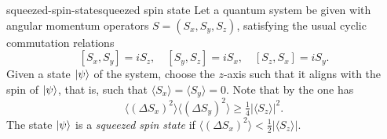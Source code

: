 \begin{topic}{squeezed-spin-state}{squeezed spin state}
    Let a quantum system be given with angular momentum operators $S = (S_x, S_y, S_z)$, satisfying the usual cyclic commutation relations
    \[ [S_x, S_y] = i S_z, \quad [S_y, S_z] = i S_x, \quad [S_z, S_x] = i S_y . \]
    Given a state $|\psi\rangle$ of the system, choose the $z$-axis such that it aligns with the spin of $|\psi\rangle$, that is, such that $\langle S_x \rangle = \langle S_y \rangle = 0$.
    Note that by the  one has
    \[ \langle (\Delta S_x)^2 \rangle \langle (\Delta S_y)^2 \rangle \ge \tfrac{1}{4} |\langle S_z \rangle|^2 . \]
    The state $|\psi\rangle$ is a \emph{squeezed spin state} if $\langle (\Delta S_x)^2 \rangle < \tfrac{1}{2} | \langle S_z \rangle |$.
\end{topic}

